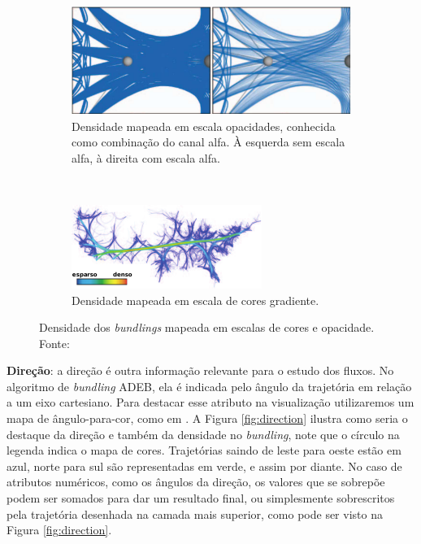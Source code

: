 \begin{figure}[ht!]
  \centering
  \begin{subfigure}[t]{\textwidth}
    \centering
    \includegraphics[width=\textwidth]{../figuras/alpha-blending.pdf}
    \caption{Densidade mapeada em escala opacidades, conhecida como combinação do canal alfa. À esquerda sem escala alfa, à direita com escala alfa.}
  \end{subfigure}
  ~
  \begin{subfigure}[t]{\textwidth}
    \centering
    \includegraphics[width=\textwidth]{../figuras/color-density.pdf}
    \caption{Densidade mapeada em escala de cores gradiente.}
  \end{subfigure}

  \caption[Densidade dos \emph{bundlings} mapeada em escalas de cores e
  opacidade.]{Densidade dos \emph{bundlings} mapeada em escalas de cores e
  opacidade. Fonte: \citet{Lhuillier2017} \label{fig:density-mappings}}
\end{figure}

\textbf{Direção}: a direção é outra informação relevante para o estudo dos
fluxos.  No algoritmo de \emph{bundling} ADEB, ela é indicada pelo ângulo da
trajetória em relação a um eixo cartesiano. Para destacar esse atributo na
visualização utilizaremos um mapa de ângulo-para-cor, como em
\citet{ZegarraFlores2016}. A Figura \ref{fig:direction} ilustra como seria o
destaque da direção e também da densidade no \emph{bundling}, note que o círculo na
legenda indica o mapa de cores. Trajetórias saindo de leste para oeste estão em
azul, norte para sul são representadas em verde, e assim por diante. No caso de
atributos numéricos, como os ângulos da direção, os valores que se sobrepõe
podem ser somados para dar um resultado final, ou simplesmente sobrescritos
pela trajetória desenhada na camada mais superior, como pode ser visto  na Figura
\ref{fig:direction}.

